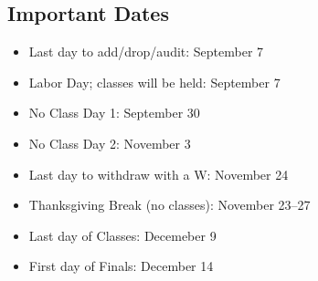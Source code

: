 \documentclass[11pt]{amsart}
\begin{document}
\subsection*{Important Dates}
\begin{itemize}
\item Last day to add/drop/audit: September 7
\item Labor Day; classes will be held: September 7
\item No Class Day 1: September 30
\item No Class Day 2: November 3
\item Last day to withdraw with a W: November 24
\item Thanksgiving Break (no classes): November 23--27
\item Last day of Classes: Decemeber 9
\item First day of Finals: December 14
\end{itemize}
\end{document}

